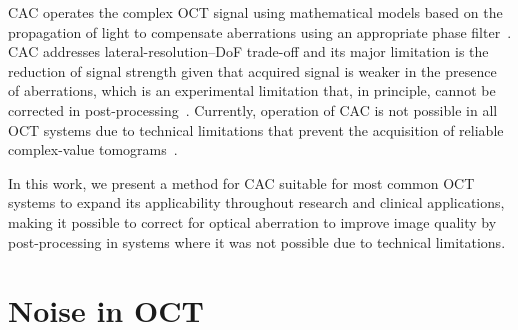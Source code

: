 CAC operates the complex OCT signal using mathematical models based on the propagation of light to compensate aberrations using an appropriate phase filter~\cite{Ralston2006_Interferometric, Yasuno2006_Noniterative, Adie2012_Computational}. CAC addresses lateral-resolution--DoF trade-off and its major limitation is the reduction of signal strength given that acquired signal is weaker in the presence of aberrations, which is an experimental limitation that, in principle, cannot be corrected in post-processing~\cite{Wu2019_Computed}. Currently, operation of CAC is not possible in all OCT systems due to technical limitations that prevent the acquisition of reliable complex-value tomograms~\cite{Shemonski2014_Stability}.

In this work, we present a method for CAC suitable for most common OCT systems to expand its applicability throughout research and clinical applications, making it possible to correct for optical aberration to improve image quality by post-processing in systems where it was not possible due to technical limitations.

\section{Noise in OCT}

